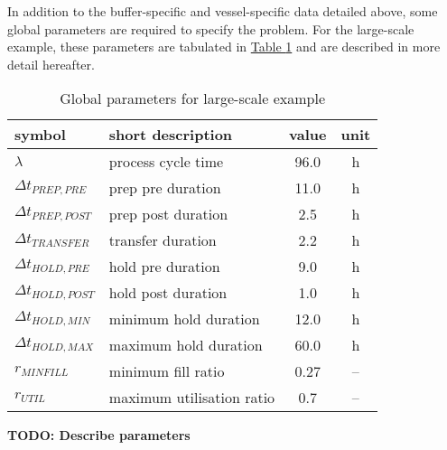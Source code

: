 In addition to the buffer-specific and vessel-specific data detailed above,
some global parameters are required to specify the problem.
For the large-scale example, these parameters are tabulated in
\hyperref[tbl.parameters]{Table \ref*{tbl.parameters}} and are described in
more detail hereafter.
\begin{table}[h!]
    \centering
    \caption{Global parameters for large-scale example}
    \label{tbl.parameters}
    \begin{tabular}{l | l | c | c}
        symbol & short description & value & unit\\ \hline
        $\lambda$ & process cycle time & 96.0 & h\\
        $\Delta t_{PREP,PRE}$ & prep pre duration & 11.0 & h\\
        $\Delta t_{PREP,POST}$ & prep post duration & 2.5 & h\\
        $\Delta t_{TRANSFER}$ & transfer duration & 2.2 & h\\
        $\Delta t_{HOLD,PRE}$ & hold pre duration & 9.0 & h\\
        $\Delta t_{HOLD,POST}$ & hold post duration & 1.0 & h\\
        $\Delta t_{HOLD,MIN}$ & minimum hold duration & 12.0 & h\\
        $\Delta t_{HOLD,MAX}$ & maximum hold duration & 60.0 & h\\
        $r_{MINFILL}$ & minimum fill ratio & 0.27 & --\\
        $r_{UTIL}$ & maximum utilisation ratio & 0.7 & --\\
    \end{tabular}
\end{table}

\textbf{TODO: Describe parameters}

